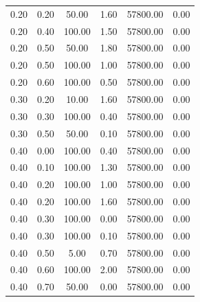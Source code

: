 \begin{table}
\begin{tabular}[c]{|c|c|c|c|c|c|}
        0.20 & 0.20 & 50.00 & 1.60 & 57800.00 & 0.00 \\
        0.20 & 0.40 & 100.00 & 1.50 & 57800.00 & 0.00 \\
        0.20 & 0.50 & 50.00 & 1.80 & 57800.00 & 0.00 \\
        0.20 & 0.50 & 100.00 & 1.00 & 57800.00 & 0.00 \\
        0.20 & 0.60 & 100.00 & 0.50 & 57800.00 & 0.00 \\
        0.30 & 0.20 & 10.00 & 1.60 & 57800.00 & 0.00 \\
        0.30 & 0.30 & 100.00 & 0.40 & 57800.00 & 0.00 \\
        0.30 & 0.50 & 50.00 & 0.10 & 57800.00 & 0.00 \\
        0.40 & 0.00 & 100.00 & 0.40 & 57800.00 & 0.00 \\
        0.40 & 0.10 & 100.00 & 1.30 & 57800.00 & 0.00 \\
        0.40 & 0.20 & 100.00 & 1.00 & 57800.00 & 0.00 \\
        0.40 & 0.20 & 100.00 & 1.60 & 57800.00 & 0.00 \\
        0.40 & 0.30 & 100.00 & 0.00 & 57800.00 & 0.00 \\
        0.40 & 0.30 & 100.00 & 0.10 & 57800.00 & 0.00 \\
        0.40 & 0.50 & 5.00 & 0.70 & 57800.00 & 0.00 \\
        0.40 & 0.60 & 100.00 & 2.00 & 57800.00 & 0.00 \\
        0.40 & 0.70 & 50.00 & 0.00 & 57800.00 & 0.00 \\ \hline
\end{tabular}
\end{table}
\clearpage
